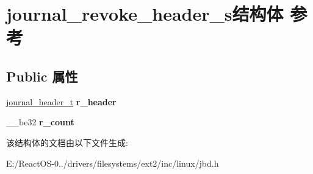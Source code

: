 \hypertarget{structjournal__revoke__header__s}{}\section{journal\+\_\+revoke\+\_\+header\+\_\+s结构体 参考}
\label{structjournal__revoke__header__s}
\subsection*{Public 属性}
\begin{DoxyCompactItemize}
\item 
\mbox{\label{structjournal__revoke__header__s_aa9f3a091c8fd5968810d955e3d2673b9}} 
\hyperlink{structjournal__header__s}{journal\+\_\+header\+\_\+t} {\bfseries r\+\_\+header}
\item 
\mbox{\label{structjournal__revoke__header__s_ab26c9ad58d3d5ecace206a859ce08d7d}} 
\+\_\+\+\_\+be32 {\bfseries r\+\_\+count}
\end{DoxyCompactItemize}


该结构体的文档由以下文件生成\+:\begin{DoxyCompactItemize}
\item 
E\+:/\+React\+O\+S-\/0../drivers/filesystems/ext2/inc/linux/jbd.\+h\end{DoxyCompactItemize}

